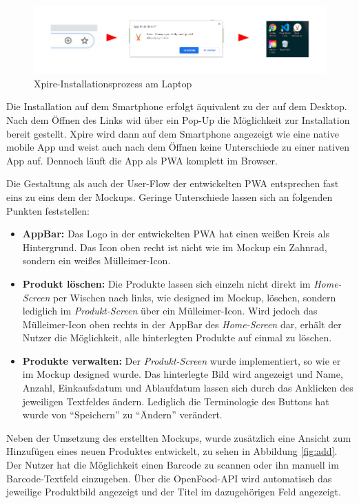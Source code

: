 \begin{figure}[h!]
	\centering
	\includegraphics[width=1.1\textwidth]{img/install.pdf}
	\caption{Xpire-Installationsprozess am Laptop}
	\label{fig:install}
\end{figure}

Die Installation auf dem Smartphone erfolgt äquivalent zu der auf dem Desktop. Nach dem Öffnen des Links wid über ein Pop-Up die Möglichkeit zur Installation bereit gestellt. Xpire wird dann auf dem Smartphone angezeigt wie eine native mobile App und weist auch nach dem Öffnen keine Unterschiede zu einer nativen App auf. Dennoch läuft die App als PWA komplett im Browser. 

Die Gestaltung als auch der User-Flow der entwickelten PWA entsprechen fast eins zu eins dem der Mockups. Geringe Unterschiede lassen sich an folgenden Punkten feststellen:
 \begin{itemize}[noitemsep]
 	\item \textbf{AppBar:} Das Logo in der entwickelten PWA hat einen weißen Kreis als Hintergrund. Das Icon oben recht ist nicht wie im Mockup ein Zahnrad, sondern ein weißes Mülleimer-Icon.
 	\item \textbf{Produkt löschen:} Die Produkte lassen sich einzeln nicht direkt im \textit{Home-Screen} per Wischen nach links, wie designed im Mockup, löschen, sondern lediglich im \textit{Produkt-Screen} über ein Mülleimer-Icon. Wird jedoch das Mülleimer-Icon oben rechts in der AppBar des \textit{Home-Screen} dar, erhält der Nutzer die Möglichkeit, alle hinterlegten Produkte auf einmal zu löschen.
 	\item \textbf{Produkte verwalten:} Der \textit{Produkt-Screen} wurde implementiert, so wie er im Mockup designed wurde. Das hinterlegte Bild wird angezeigt und Name, Anzahl, Einkaufsdatum und Ablaufdatum lassen sich durch das Anklicken des jeweiligen Textfeldes ändern. Lediglich die Terminologie des Buttons hat wurde von \enquote{Speichern} zu \enquote{Ändern} verändert.
 \end{itemize}

Neben der Umsetzung des erstellten Mockups, wurde zusätzlich eine Ansicht zum Hinzufügen eines neuen Produktes entwickelt, zu sehen in Abbildung \ref{fig:add}. Der Nutzer hat die Möglichkeit einen Barcode zu scannen oder ihn manuell im Barcode-Textfeld einzugeben. Über die OpenFood-API wird automatisch das jeweilige Produktbild angezeigt und der Titel im dazugehörigen Feld angezeigt.

